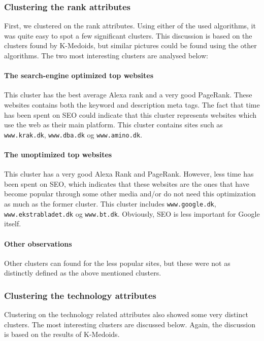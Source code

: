 \subsubsection{Clustering the rank attributes}

First, we clustered on the rank attributes. Using either of the used algorithms, it was quite easy to spot a few significant clusters. This discussion is based on the clusters found by K-Medoids, but similar pictures could be found using the other algorithms. The two most interesting clusters are analysed below:

\paragraph{The search-engine optimized top websites} 

This cluster has the best average Alexa rank and a very good PageRank. These websites contains both the keyword and description meta tags. The fact that time has been spent on SEO could indicate that this cluster represents websites which use the web as their main platform. This cluster contains sites such as \verb|www.krak.dk|, \verb|www.dba.dk| og \verb|www.amino.dk|.

\paragraph{The unoptimized top websites} 

This cluster has a very good Alexa Rank and PageRank. However, less time has been spent on SEO, which indicates that these websites are the ones that have become popular through some other media and/or do not need this optimization as much as the former cluster. This cluster includes \verb|www.google.dk|, \verb|www.ekstrabladet.dk| og \verb|www.bt.dk|. Obviously, SEO is less important for Google itself.

\paragraph{Other observations} Other clusters can found for the less popular sites, but these were not as distinctly defined as the above mentioned clusters.

\subsubsection{Clustering the technology attributes}

Clustering on the technology related attributes also showed some very distinct clusters. The most interesting clusters are discussed below. Again, the discussion is based on the results of K-Medoids.

